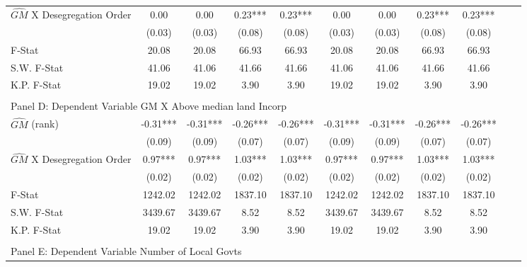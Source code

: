 \begin{table}[htbp]
\begin{threeparttable}
\begin{tabular}{l*{10}{c}}
\addlinespace
$\hat{GM}$ X Desegregation Order&       0.00   &       0.00   &       0.23***&       0.23***&       0.00   &       0.00   &       0.23***&       0.23***\\
                &     (0.03)   &     (0.03)   &     (0.08)   &     (0.08)   &     (0.03)   &     (0.03)   &     (0.08)   &     (0.08)   \\
\midrule
F-Stat          &      20.08   &      20.08   &      66.93   &      66.93   &      20.08   &      20.08   &      66.93   &      66.93   \\
S.W. F-Stat     &      41.06   &      41.06   &      41.66   &      41.66   &      41.06   &      41.06   &      41.66   &      41.66   \\
K.P. F-Stat     &      19.02   &      19.02   &       3.90   &       3.90   &      19.02   &      19.02   &       3.90   &       3.90   \\
\cmidrule[\heavyrulewidth](lr){1-9} \\ \cmidrule[\heavyrulewidth](lr){1-9}
\multicolumn{8}{l}{Panel D: Dependent Variable GM X Above median land Incorp}\\
\cmidrule(lr){1-9}
$\hat{GM}$ (rank)&      -0.31***&      -0.31***&      -0.26***&      -0.26***&      -0.31***&      -0.31***&      -0.26***&      -0.26***\\
                &     (0.09)   &     (0.09)   &     (0.07)   &     (0.07)   &     (0.09)   &     (0.09)   &     (0.07)   &     (0.07)   \\
\addlinespace
$\hat{GM}$ X Desegregation Order&       0.97***&       0.97***&       1.03***&       1.03***&       0.97***&       0.97***&       1.03***&       1.03***\\
                &     (0.02)   &     (0.02)   &     (0.02)   &     (0.02)   &     (0.02)   &     (0.02)   &     (0.02)   &     (0.02)   \\
\midrule
F-Stat          &    1242.02   &    1242.02   &    1837.10   &    1837.10   &    1242.02   &    1242.02   &    1837.10   &    1837.10   \\
S.W. F-Stat     &    3439.67   &    3439.67   &       8.52   &       8.52   &    3439.67   &    3439.67   &       8.52   &       8.52   \\
K.P. F-Stat     &      19.02   &      19.02   &       3.90   &       3.90   &      19.02   &      19.02   &       3.90   &       3.90   \\
\cmidrule[\heavyrulewidth](lr){1-9} \\ \cmidrule[\heavyrulewidth](lr){1-9}
\multicolumn{8}{l}{Panel E: Dependent Variable Number of Local Govts}\\

\end{tabular}
\end{threeparttable}
\end{table}
